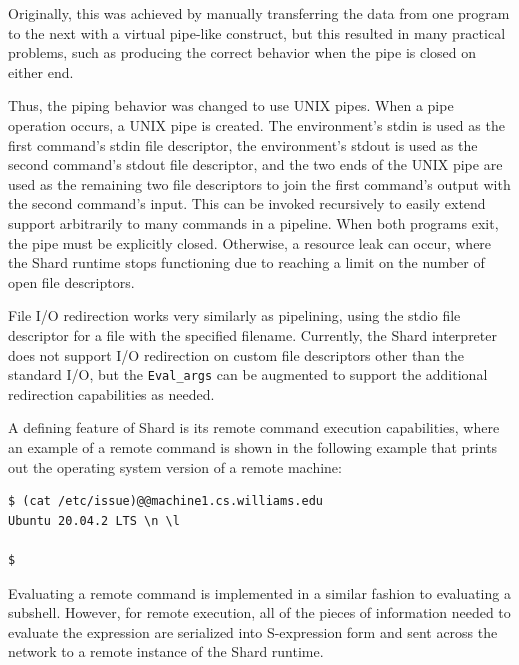 \documentclass[twoside]{report}
\begin{document}
Originally, this was achieved by manually transferring the data from one program to the next with a virtual pipe-like construct, but this resulted in many practical problems, such as producing the correct behavior when the pipe is closed on either end.

Thus, the piping behavior was changed to use UNIX pipes.
When a pipe operation occurs, a UNIX pipe is created.
The environment's stdin is used as the first command's stdin file descriptor, the environment's stdout is used as the second command's stdout file descriptor, and the two ends of the UNIX pipe are used as the remaining two file descriptors to join the first command's output with the second command's input.
This can be invoked recursively to easily extend support arbitrarily to many commands in a pipeline.
When both programs exit, the pipe must be explicitly closed.
Otherwise, a resource leak can occur, where the Shard runtime stops functioning due to reaching a limit on the number of open file descriptors.

File I/O redirection works very similarly as pipelining, using the stdio file descriptor for a file with the specified filename.
Currently, the Shard interpreter does not support I/O redirection on custom file descriptors other than the standard I/O, but the \texttt{Eval\_args} can be augmented to support the additional redirection capabilities as needed.

A defining feature of Shard is its remote command execution capabilities, where an example of a remote command is shown in the following example that prints out the operating system version of a remote machine:

\begin{minipage}[c]{\textwidth-15pt}
  \begin{lstlisting}[language=shard]
$ (cat /etc/issue)@@machine1.cs.williams.edu
Ubuntu 20.04.2 LTS \n \l

$
\end{lstlisting}
  \smallskip
\end{minipage}

Evaluating a remote command is implemented in a similar fashion to evaluating a subshell.
However, for remote execution, all of the pieces of information needed to evaluate the expression are serialized into S-expression form and sent across the network to a remote instance of the Shard runtime.
\end{document}
